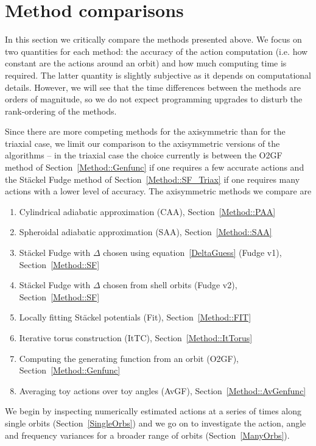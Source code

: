 \documentclass[useAMS,usenatbib,fleqn,a4paper]{mn2e}
\begin{document}
\section{Method comparisons}\label{Sect::MethodComparison}

In this section we critically compare the methods presented
above. We focus on two quantities for each method: the accuracy of
the action computation (i.e. how constant are the actions around an orbit)
and how much computing time is required. The latter quantity is
slightly subjective as it depends on  computational
details. However, we will see that the time differences between the methods
are orders of magnitude, so we do not expect programming upgrades to disturb
the rank-ordering of the methods.

Since there are more competing methods for the
axisymmetric than for the triaxial case,
we limit our comparison to the axisymmetric versions of the
algorithms -- in the triaxial case the choice currently is between
the O2GF method of Section~\ref{Method::Genfunc} if one
requires a few accurate actions and the St\"ackel Fudge method of
Section~\ref{Method::SF_Triax} if one requires many actions with a lower
level of accuracy. The  axisymmetric methods we compare are
 \begin{enumerate}
\item Cylindrical adiabatic approximation (CAA), Section~\ref{Method::PAA}
\item Spheroidal adiabatic approximation (SAA), Section~\ref{Method::SAA}
\item St\"ackel Fudge with $\Delta$ chosen using equation~\eqref{DeltaGuess} (Fudge v1), Section~\ref{Method::SF}
\item St\"ackel Fudge with $\Delta$ chosen from shell orbits (Fudge v2), Section~\ref{Method::SF}
\item Locally fitting St\"ackel potentials (Fit), Section~\ref{Method::FIT}
\item Iterative torus construction (ItTC), Section~\ref{Method::ItTorus}
\item Computing the generating function  from an orbit (O2GF), Section~\ref{Method::Genfunc}
\item Averaging toy actions over toy angles (AvGF), Section~\ref{Method::AvGenfunc}
\end{enumerate}
 We begin by inspecting numerically estimated actions at a series of times
along single orbits (Section~\ref{SingleOrbs}) and we go on to investigate
the action, angle and frequency variances for a broader range of orbits
(Section~\ref{ManyOrbs}).
\end{document}
